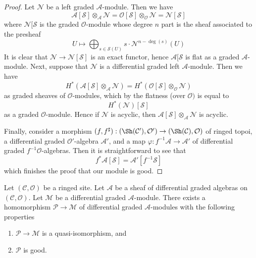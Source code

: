 \begin{proof}
Let $\mathcal{N}$ be a left graded $\mathcal{A}$-module.
Then we have
$$
\mathcal{A}[\mathcal{S}] \otimes_\mathcal{A} \mathcal{N} =
\mathcal{O}[\mathcal{S}] \otimes_\mathcal{O} \mathcal{N} =
\mathcal{N}[\mathcal{S}]
$$
where $\mathcal{N}[\mathcal{S}$ is the
graded $\mathcal{O}$-module whose degree $n$ part
is the sheaf associated to the presheaf
$$
U \longmapsto
\bigoplus\nolimits_{s \in \mathcal{S}(U)} s \cdot \mathcal{N}^{n - \deg(s)}(U)
$$
It is clear that $\mathcal{N} \to \mathcal{N}[\mathcal{S}]$
is an exact functor, hence $\mathcal{A}[\mathcal{S}$ is flat
as a graded $\mathcal{A}$-module. Next, suppose that $\mathcal{N}$
is a differential graded left $\mathcal{A}$-module. Then we have
$$
H^*(\mathcal{A}[\mathcal{S}] \otimes_\mathcal{A} \mathcal{N}) =
H^*(\mathcal{O}[\mathcal{S}] \otimes_\mathcal{O} \mathcal{N})
$$
as graded sheaves of $\mathcal{O}$-modules, which by the flatness
(over $\mathcal{O})$ is equal to
$$
H^*(\mathcal{N})[\mathcal{S}]
$$
as a graded $\mathcal{O}$-module. Hence if $\mathcal{N}$ is acyclic,
then $\mathcal{A}[\mathcal{S}] \otimes_\mathcal{A} \mathcal{N}$
is acyclic.

\medskip\noindent
Finally, consider a morphism
$(f, f^\sharp) : (\Sh(\mathcal{C}'), \mathcal{O}')
\to (\Sh(\mathcal{C}), \mathcal{O})$
of ringed topoi, a differential graded $\mathcal{O}'$-algebra
$\mathcal{A}'$, and a map $\varphi : f^{-1}\mathcal{A} \to \mathcal{A}'$
of differential graded $f^{-1}\mathcal{O}$-algebras.
Then it is straightforward to see that
$$
f^*\mathcal{A}[\mathcal{S}] = \mathcal{A}'[f^{-1}\mathcal{S}]
$$
which finishes the proof that our module is good.
\end{proof}

\begin{lemma}
\label{lemma-resolve}
Let $(\mathcal{C}, \mathcal{O})$ be a ringed site.
Let $\mathcal{A}$ be a sheaf of differential graded algebras
on $(\mathcal{C}, \mathcal{O})$. Let $\mathcal{M}$
be a differential graded $\mathcal{A}$-module. There exists a homomorphism
$\mathcal{P} \to \mathcal{M}$ of differential graded $\mathcal{A}$-modules
with the following properties
\begin{enumerate}
\item $\mathcal{P} \to \mathcal{M}$ is a quasi-isomorphism, and
\item $\mathcal{P}$ is good.
\end{enumerate}
\end{lemma}

